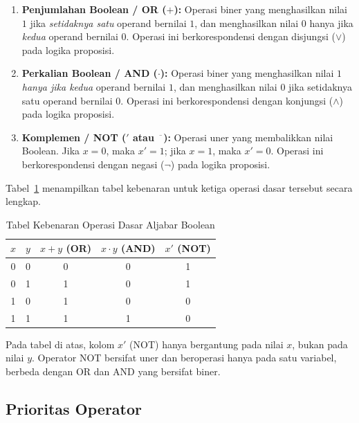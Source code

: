 \begin{enumerate}[label=\textbf{\arabic*.}, itemsep=8pt]
  \item \textbf{Penjumlahan Boolean / OR ($+$):} Operasi biner yang menghasilkan nilai $1$ jika \emph{setidaknya satu} operand bernilai $1$, dan menghasilkan nilai $0$ hanya jika \emph{kedua} operand bernilai $0$. Operasi ini berkorespondensi dengan disjungsi ($\vee$) pada logika proposisi.

  \item \textbf{Perkalian Boolean / AND ($\cdot$):} Operasi biner yang menghasilkan nilai $1$ \emph{hanya jika kedua} operand bernilai $1$, dan menghasilkan nilai $0$ jika setidaknya satu operand bernilai $0$. Operasi ini berkorespondensi dengan konjungsi ($\wedge$) pada logika proposisi.

  \item \textbf{Komplemen / NOT ($'$ atau $\overline{\phantom{x}}$):} Operasi uner yang membalikkan nilai Boolean. Jika $x = 0$, maka $x' = 1$; jika $x = 1$, maka $x' = 0$. Operasi ini berkorespondensi dengan negasi ($\neg$) pada logika proposisi.
\end{enumerate}

Tabel~\ref{tab:operasi-dasar-boolean} menampilkan tabel kebenaran untuk ketiga operasi dasar tersebut secara lengkap.

\begin{table}[htbp]
\centering
\renewcommand{\arraystretch}{1.3}
\begin{tabular}{|c|c||c|c|c|}
\hline
$x$ & $y$ & $x + y$ (OR) & $x \cdot y$ (AND) & $x'$ (NOT) \\ \hline
0 & 0 & 0 & 0 & 1 \\ \hline
0 & 1 & 1 & 0 & 1 \\ \hline
1 & 0 & 1 & 0 & 0 \\ \hline
1 & 1 & 1 & 1 & 0 \\ \hline
\end{tabular}
\caption{Tabel Kebenaran Operasi Dasar Aljabar Boolean}
\label{tab:operasi-dasar-boolean}
\end{table}

\begin{catatan}
Pada tabel di atas, kolom $x'$ (NOT) hanya bergantung pada nilai $x$, bukan pada nilai $y$. Operator NOT bersifat uner dan beroperasi hanya pada satu variabel, berbeda dengan OR dan AND yang bersifat biner.
\end{catatan}

\subsection{Prioritas Operator}

